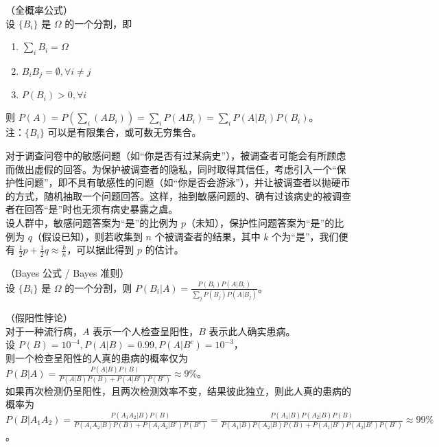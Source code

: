 \documentclass[../main.tex]{subfiles}
\begin{document}
\begin{theorem}\label{thm:1.8.1}
    （全概率公式）\\
    设 $\{B_i\}$ 是 $\Omega$ 的一个分割，即
    \begin{enumerate}
        \item $\sum_iB_i=\Omega$
        \item $B_iB_j=\emptyset,\forall i\neq j$
        \item $P(B_i)>0,\forall i$
    \end{enumerate}
    则 $P(A)=P(\sum_{i}(AB_i))=\sum_iP(AB_i)=\sum_iP(A|B_i)P(B_i)$。\\
    注：$\{B_i\}$ 可以是有限集合，或可数无穷集合。
\end{theorem}

\begin{example}
    对于调查问卷中的敏感问题（如“你是否有过某病史”），被调查者可能会有所顾虑而做出虚假的回答。为保护被调查者的隐私，同时取得其信任，考虑引入一个“保护性问题”，即不具有敏感性的问题（如“你是否会游泳”），并让被调查者以抛硬币的方式，随机抽取一个问题回答。这样，抽到敏感问题的、确有过该病史的被调查者在回答“是”时也无须有病史暴露之虞。\\
    设人群中，敏感问题答案为“是”的比例为 $p$（未知），保护性问题答案为“是”的比例为 $q$（假设已知），则若收集到 $n$ 个被调查者的结果，其中 $k$ 个为“是”，我们便有 $\frac{1}{2}p+\frac{1}{2}q\approx \frac{k}{n}$，可以据此得到 $p$ 的估计。
\end{example}

\begin{theorem}\label{thm:1.8.2}
    （Bayes 公式 / Bayes 准则）\\
    设 $\{B_i\}$ 是 $\Omega$ 的一个分割，则 $P(B_i|A)=\frac{P(B_i)P(A|B_i)}{\sum_j P(B_j)P(A|B_j)}$。
\end{theorem}

\begin{example}
    （假阳性悖论）\\
    对于一种流行病，$A$ 表示一个人检查呈阳性，$B$ 表示此人确实患病。\\
    设 $P(B)=10^{-4},P(A|B)=0.99,P(A|B^c)=10^{-3}$，\\
    则一个检查呈阳性的人真的患病的概率仅为 $P(B|A)=\frac{P(A|B)P(B)}{P(A|B)P(B)+P(A|B^c)P(B^c)}\approx 9\%$。\\
    如果再次检测仍呈阳性，且两次检测效率不变，结果彼此独立，则此人真的患病的概率为 $P(B|A_1A_2)=\frac{P(A_1A_2|B)P(B)}{P(A_1A_2|B)P(B)+P(A_1A_2|B^c)P(B^c)}=\frac{P(A_1|B)P(A_2|B)P(B)}{P(A_1|B)P(A_2|B)P(B)+P(A_1|B^c)P(A_2|B^c)P(B^c)}\approx 99\%$。
\end{example}
\end{document}
